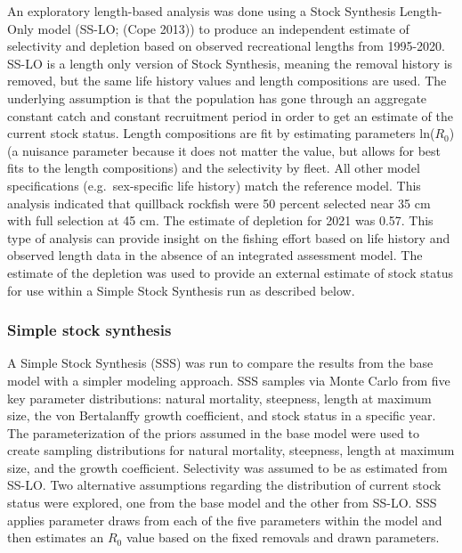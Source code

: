 \documentclass[11pt,
  english,
  a4paper,
]{article}
\begin{document}
\leavevmode\tagmcend\tagstructend


An exploratory length-based analysis was done using a Stock Synthesis Length-Only model (SS-LO; {(Cope 2013)\leavevmode\tagmcend\tagstructend}) to produce an independent estimate of selectivity and depletion based on observed recreational lengths from 1995-2020. SS-LO is a length only version of Stock Synthesis, meaning the removal history is removed, but the same life history values and length compositions are used. The underlying assumption is that the population has gone through an aggregate constant catch and constant recruitment period in order to get an estimate of the current stock status. Length compositions are fit by estimating parameters ln({\(R_0\)\leavevmode\tagmcend\tagstructend}) (a nuisance parameter because it does not matter the value, but allows for best fits to the length compositions) and the selectivity by fleet. All other model specifications (e.g.~sex-specific life history) match the reference model. This analysis indicated that quillback rockfish were 50 percent selected near 35 cm with full selection at 45 cm. The estimate of depletion for 2021 was 0.57. This type of analysis can provide insight on the fishing effort based on life history and observed length data in the absence of an integrated assessment model. The estimate of the depletion was used to provide an external estimate of stock status for use within a Simple Stock Synthesis run as described below.

\leavevmode\tagmcend\tagstructend\par


\hypertarget{simple-stock-synthesis}{%
\subsubsection{Simple stock synthesis}\label{simple-stock-synthesis}}

\leavevmode\tagmcend\tagstructend


A Simple Stock Synthesis (SSS) was run to compare the results from the base model with a simpler modeling approach. SSS samples via Monte Carlo from five key parameter distributions: natural mortality, steepness, length at maximum size, the von Bertalanffy growth coefficient, and stock status in a specific year. The parameterization of the priors assumed in the base model were used to create sampling distributions for natural mortality, steepness, length at maximum size, and the growth coefficient. Selectivity was assumed to be as estimated from SS-LO. Two alternative assumptions regarding the distribution of current stock status were explored, one from the base model and the other from SS-LO. SSS applies parameter draws from each of the five parameters within the model and then estimates an {\(R_0\)\leavevmode\tagmcend\tagstructend} value based on the fixed removals and drawn parameters.
\end{document}
